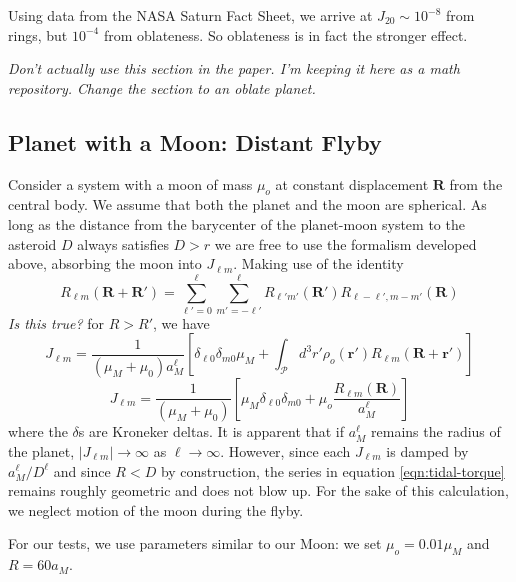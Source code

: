 \documentclass{aastex631}
\newcommand{\brackets}[1]{\left[ #1 \right]}
\newcommand{\jtd}[1]{{\color{red}\textit{#1}}}
\begin{document}
Using data from the NASA Saturn Fact Sheet, we arrive at $J_{20}\sim 10^{-8}$ from rings, but $10^{-4}$ from oblateness. So oblateness is in fact the stronger effect.

\jtd{Don't actually use this section in the paper. I'm keeping it here as a math repository. Change the section to an oblate planet.}

\subsection{Planet with a Moon: Distant Flyby}
Consider a system with a moon of mass $\mu_{o}$ at constant displacement $\mathbf R$ from the central body. We assume that both the planet and the moon are spherical. As long as the distance from the barycenter of the planet-moon system to the asteroid $D$ always satisfies $D>r$ we are free to use the formalism developed above, absorbing the moon into $J_{\ell m}$. Making use of the identity \cite{Gelderen1998TheSO}
\begin{equation}
R_{\ell m}(\mathbf R + \mathbf R') = \sum_{\ell' = 0}^\ell \sum_{m'=-\ell'}^\ell R_{\ell' m'}(\mathbf R') R_{\ell-\ell', m-m'}(\mathbf R)
\end{equation}
\jtd{Is this true?}
for $R > R'$, we have
\begin{equation}
J_{\ell m} = \frac{1}{(\mu_M+\mu_0) a_M^\ell}\brackets{\delta_{\ell 0}\delta_{m0}\mu_M + \int_\mathcal{P} d^3 r' \rho_o(\mathbf r') R_{\ell m}(\mathbf R + \mathbf r')}
\end{equation}
\begin{equation}
J_{\ell m} = \frac{1}{(\mu_M+\mu_0)}\brackets{\mu_M\delta_{\ell 0}\delta_{m0} + \mu_o \frac{R_{\ell m}(\mathbf R)}{ a_M^\ell}}
\end{equation}
where the $\delta$s are Kroneker deltas. It is apparent that if $a_M^\ell$ remains the radius of the planet, $|J_{\ell m}| \rightarrow \infty$ as $\ell \rightarrow \infty$. However, since each $J_{\ell m}$ is damped by $a_M^\ell / D^\ell$ and since $R < D$ by construction, the series in equation \ref{eqn:tidal-torque} remains roughly geometric and does not blow up. For the sake of this calculation, we neglect motion of the moon during the flyby.

For our tests, we use parameters similar to our Moon: we set $\mu_o = 0.01 \mu_M$ and $R = 60 a_M$.
\end{document}
